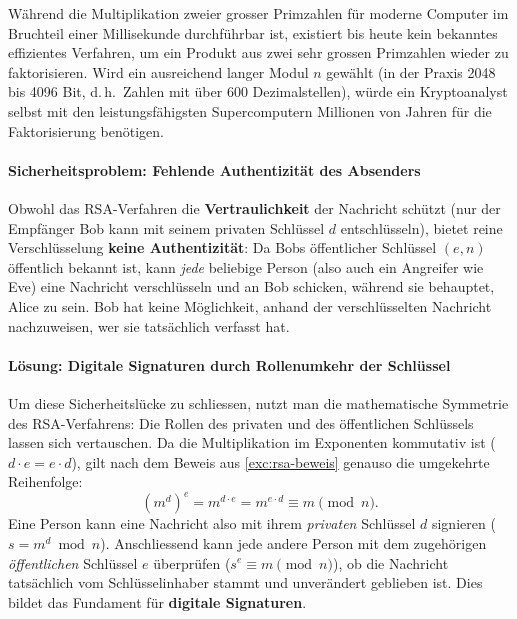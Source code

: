 Während die Multiplikation zweier grosser Primzahlen für moderne Computer im Bruchteil einer Millisekunde durchführbar ist, existiert bis heute kein bekanntes effizientes Verfahren, um ein Produkt aus zwei sehr grossen Primzahlen wieder zu faktorisieren. Wird ein ausreichend langer Modul $n$ gewählt (in der Praxis 2048 bis 4096 Bit, d.\,h.\ Zahlen mit über 600 Dezimalstellen), würde ein Kryptoanalyst selbst mit den leistungsfähigsten Supercomputern Millionen von Jahren für die Faktorisierung benötigen.

\paragraph*{Sicherheitsproblem: Fehlende Authentizität des Absenders}
Obwohl das \gls{RSA}-Verfahren die \textbf{Vertraulichkeit} der Nachricht schützt (nur der Empfänger Bob kann mit seinem privaten Schlüssel $d$ entschlüsseln), bietet reine Verschlüsselung \textbf{keine Authentizität}: Da Bobs öffentlicher Schlüssel $(e, n)$ öffentlich bekannt ist, kann \emph{jede} beliebige Person (also auch ein Angreifer wie Eve) eine Nachricht verschlüsseln und an Bob schicken, während sie behauptet, Alice zu sein. Bob hat keine Möglichkeit, anhand der verschlüsselten Nachricht nachzuweisen, wer sie tatsächlich verfasst hat.

\paragraph*{Lösung: Digitale Signaturen durch Rollenumkehr der Schlüssel}
Um diese Sicherheitslücke zu schliessen, nutzt man die mathematische Symmetrie des \gls{RSA}-Verfahrens: Die Rollen des privaten und des öffentlichen Schlüssels lassen sich vertauschen. Da die Multiplikation im Exponenten kommutativ ist ($d \cdot e = e \cdot d$), gilt nach dem Beweis aus \cref{exc:rsa-beweis} genauso die umgekehrte Reihenfolge:
\[
	(m^d)^e = m^{d \cdot e} = m^{e \cdot d} \equiv m \pmod n.
\]
Eine Person kann eine Nachricht also mit ihrem \emph{privaten} Schlüssel $d$ signieren ($s = m^d \bmod n$). Anschliessend kann jede andere Person mit dem zugehörigen \emph{öffentlichen} Schlüssel $e$ überprüfen ($s^e \equiv m \pmod n$), ob die Nachricht tatsächlich vom Schlüsselinhaber stammt und unverändert geblieben ist. Dies bildet das Fundament für \textbf{digitale Signaturen}.

